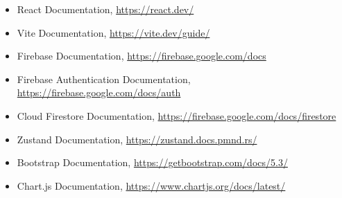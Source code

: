 \documentclass[11pt,a4paper]{article}
\begin{document}
\begin{itemize}
  \item React Documentation, \url{https://react.dev/}
  \item Vite Documentation, \url{https://vite.dev/guide/}
  \item Firebase Documentation, \url{https://firebase.google.com/docs}
  \item Firebase Authentication Documentation, \url{https://firebase.google.com/docs/auth}
  \item Cloud Firestore Documentation, \url{https://firebase.google.com/docs/firestore}
  \item Zustand Documentation, \url{https://zustand.docs.pmnd.rs/}
  \item Bootstrap Documentation, \url{https://getbootstrap.com/docs/5.3/}
  \item Chart.js Documentation, \url{https://www.chartjs.org/docs/latest/}
\end{itemize}
\end{document}
